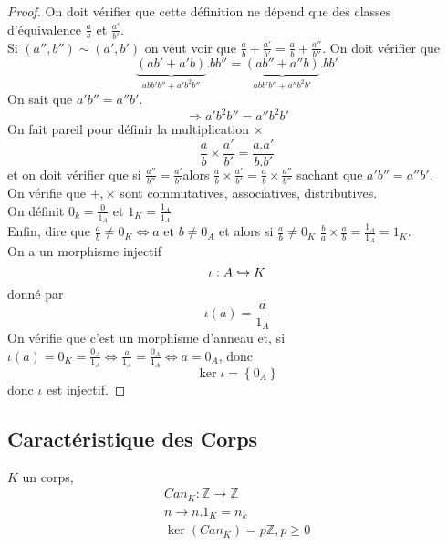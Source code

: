 \documentclass[../main.tex]{subfiles}
\begin{document}
\begin{proof}
On doit vérifier que cette définition ne dépend que des classes d'équivalence $\frac{a}{b}$ et $\frac{a'}{b'}$.\\
Si $ ( a'',b'')\sim ( a',b')$ on veut voir que $\frac{a}{b} + \frac{a'}{b'} = \frac{a}{b} + \frac{a''}{b''}$.
On doit vérifier que 
\[ 
	\underbrace{( ab' + a'b )}_{abb'b'' + a'b^{2}b''}.bb'' = \underbrace{( ab'' + a''b)}_{abb'b'' + a''b^{2}b'}.bb'
\]
On sait que $a'b'' = a''b'$.
\[ 
\Rightarrow a'b^{2}b'' = a''b^{2}b'
\]
On fait pareil pour définir la multiplication $\times$ 
\[ 
\frac{a}{b} \times \frac{a'}{b'} = \frac{a.a'}{b.b'}
\]
et on doit vérifier que si $\frac{a''}{b''} = \frac{a'}{b'}$alors $\frac{a}{b}\times \frac{a'}{b'} = \frac{a}{b} \times \frac{a''}{b''}$ sachant que $a'b'' = a'' b'$.\\
On vérifie que  $+, \times$ sont commutatives, associatives, distributives.\\
On définit $0_k = \frac{0}{1_A}$ et $1_K = \frac{1_A}{1_A}$ \\
Enfin, dire que $\frac{a}{b} \neq 0_K \iff a \text{ et } b \neq 0_A$ et alors si $\frac{a}{b}\neq 0_K$ $\frac{b}{a}\times \frac{a}{b} = \frac{1_A}{1_A}= 1_K$.\\
On a un morphisme injectif
\[ 
\iota: A \hookrightarrow K
\]
donné par 
\[ 
	\iota(a) = \frac{a}{1_A}
\]
On vérifie que c'est un morphisme d'anneau et, si $\iota(a) = 0_K = \frac{0_A}{1_A} \iff \frac{a}{1_A} = \frac{0_A}{1_A} \iff a = 0_A$, donc
\[ 
\ker \iota = \left\{ 0_A \right\} 
\]
donc $\iota$ est injectif.
\end{proof}
\subsection{Caractéristique des Corps}
$K$ un corps,
\begin{align*}
Can_K: \mathbb{Z} \to \mathbb{Z}\\
n \to n.1_K = n_k\\
\ker(Can_K) = p \mathbb{Z}, p \geq 0
\end{align*}
\end{document}
